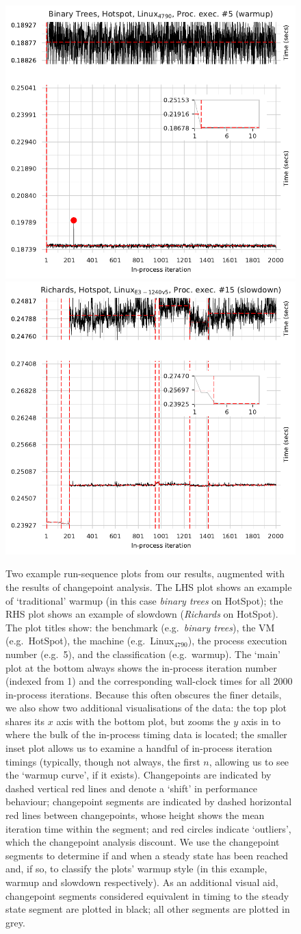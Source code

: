 \documentclass[acmsmall]{acmart}\settopmatter{printfolios=true}
\newcommand{\binarytrees}{\emph{binary trees}\xspace}
\newcommand{\richards}{\emph{Richards}\xspace}
\newcommand{\bencherfive}{Linux$_\mathrm{4790}$\xspace}
\newcommand{\numiterations}{2000\xspace}
\begin{document}
\begin{figure}[t]
\centering
\includegraphics[width=.49\textwidth]{examples/new_warmup_no_migrate.pdf}
\hspace{\fill}
\includegraphics[width=.49\textwidth]{examples/changepoint_example.pdf}
\caption{Two example run-sequence plots from our results, augmented
with the results of changepoint analysis. The LHS plot
shows an example of `traditional' warmup (in this case \binarytrees on HotSpot);
the RHS plot shows an example of slowdown (\richards on HotSpot). The
plot titles show: the benchmark (e.g.~\binarytrees), the VM (e.g.~HotSpot),
the machine (e.g.~\bencherfive), the process execution number (e.g.~5),
and the classification (e.g.~warmup). The `main' plot at the bottom always shows
the in-process iteration number (indexed from 1) and the corresponding wall-clock
times for all \numiterations in-process iterations. Because this often obscures the finer
details, we also show two additional visualisations of the data: the top plot
shares its $x$ axis with the bottom plot, but zooms the $y$ axis in to where the bulk of the
in-process timing data is located; the smaller inset plot allows us to examine a handful
of in-process iteration timings (typically, though not always, the first $n$,
allowing us to see the `warmup curve', if it exists). Changepoints
are indicated by dashed vertical red lines and denote a `shift' in performance behaviour;
changepoint segments are indicated by dashed horizontal red lines between changepoints,
whose height shows the mean iteration time within the segment;
and red circles indicate `outliers', which the changepoint analysis discount. We use the changepoint
segments to determine if and when a steady state has been reached and,
if so, to classify the plots' warmup style (in this example, warmup and
slowdown respectively). As an additional visual aid, changepoint segments
considered equivalent in timing to the steady state segment are plotted in black;
all other segments are plotted in grey.}
\label{fig:changepoint}
\end{figure}
\end{document}
